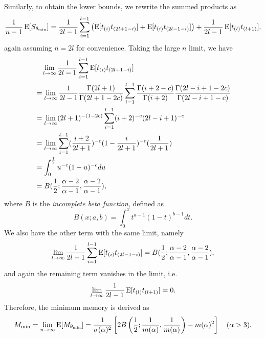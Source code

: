 Similarly, to obtain the lower bounds, we rewrite the summed products as 
\begin{equation}
	 \frac{1}{n-1} \E[S_{\theta_{\min}}] = \frac{1}{2l-1} \sum_{i=1}^{l-1} \left(\E[t_{(i)} t_{(2l+1-i)}] + \E[t_{(i)} t_{(2l-1-i)}] \right) + \frac{1}{2l-1} \E[t_{(l)}t_{(l+1)}],
\end{equation}
again assuming $ n=2l $ for convenience.
Taking the large $ n $ limit, we have
\begin{equation}
\begin{split}
&\quad \lim_{l \rightarrow \infty} \frac{1}{2l-1} \sum_{i=1}^{l-1} \E[t_{(i)} t_{(2l+1-i)}] \\
&= \lim_{l \rightarrow \infty} \frac{1}{2l-1} \frac{\Gamma(2l+1)}{\Gamma(2l+1-2c)} \sum_{i=1}^{l-1} \frac{\Gamma(i+2-c)}{\Gamma(i+2)} \frac{\Gamma(2l-i+1-2c)}{\Gamma(2l-i+1-c)} \\
&= \lim_{l \rightarrow \infty} (2l+1)^{-(1-2c)} \sum_{i=1}^{l-1} (i+2)^{-c} (2l-i+1)^{-c} \\
&= \lim_{l \rightarrow \infty} \sum_{i=1}^{l-1} (\frac{i+2}{2l+1})^{-c} (1-\frac{i}{2l+1})^{-c} (\frac{1}{2l+1}) \\
&= \int_{0}^{\frac{1}{2}} u^{-c} (1-u)^{-c} du \\
&= B(\frac{1}{2}; \frac{\alpha-2}{\alpha-1}, \frac{\alpha-2}{\alpha-1}),
\end{split}
\end{equation}
where $ B $ is the \textit{incomplete beta function}, defined as 
\begin{equation}
	B(x; a,b) = \int_{0}^{x} t^{a-1} (1-t)^{b-1} dt.
\end{equation}
We also have the other term with the same limit, namely 
\begin{equation}
\lim_{l \rightarrow \infty} \frac{1}{2l-1} \sum_{i=1}^{l-1} \E[t_{(i)} t_{(2l-1-i)}] = B(\frac{1}{2}; \frac{\alpha-2}{\alpha-1}, \frac{\alpha-2}{\alpha-1}),
\end{equation}
and again the remaining term vanishes in the limit, i.e.
\begin{equation}
	\lim_{l \rightarrow \infty} \frac{1}{2l-1} \E[t_{(l)}t_{(l+1)}] = 0.
\end{equation}
Therefore, the minimum memory is derived as
\begin{equation}
	M_{\min} = \lim_{n \rightarrow \infty} \E[M_{\theta_{\min}}] = \frac{1}{\sigma(\alpha)^2} \left[ 2B\left(\frac{1}{2}; \frac{1}{m(\alpha)}, \frac{1}{m(\alpha)}\right)  - m(\alpha)^2\right] \quad(\alpha>3). \label{eqs:min-mem-theory}
\end{equation}

